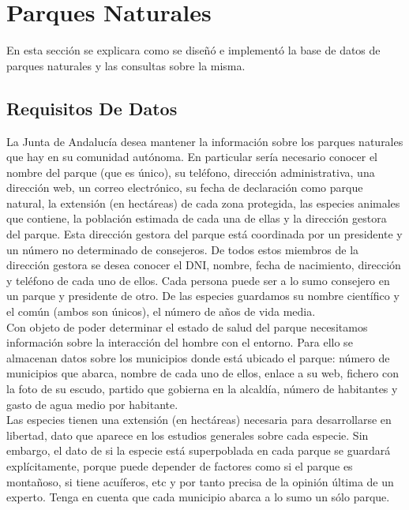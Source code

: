 \documentclass{article}
\begin{document}
\section{Parques Naturales}

En esta sección se explicara como se diseñó e implementó la base de datos de parques naturales y las consultas sobre la misma.

\subsection{Requisitos De Datos}

La Junta de Andalucía desea mantener la información sobre los parques naturales que hay en su comunidad autónoma. En particular sería necesario conocer el nombre del parque (que es único), su teléfono, dirección administrativa, una dirección web, un correo electrónico, su fecha de declaración como parque natural, la extensión (en hectáreas) de cada zona protegida, las especies animales que contiene, la población estimada de cada una de ellas y la dirección gestora del parque. Esta dirección gestora del parque está coordinada por un presidente y un número no determinado de consejeros. De todos estos miembros de la dirección gestora se desea conocer el DNI, nombre, fecha de nacimiento, dirección y teléfono de cada uno de ellos. Cada persona puede ser a lo sumo consejero en un parque y presidente de otro. De las especies guardamos su nombre científico y el común (ambos son únicos), el número de años de vida media. 
\\

Con objeto de poder determinar el estado de salud del parque necesitamos información sobre la interacción del hombre con el entorno. Para ello se almacenan datos sobre los municipios donde está ubicado el parque: número de municipios que abarca, nombre de cada uno de ellos, enlace a su web, fichero con la foto de su escudo, partido que gobierna en la alcaldía, número de habitantes y gasto de agua medio por habitante. 
\\

Las especies tienen una extensión (en hectáreas) necesaria para desarrollarse en libertad, dato que aparece en los estudios generales sobre cada especie. Sin embargo, el dato de si la especie está superpoblada en cada parque se guardará explícitamente, porque puede depender de factores como si el parque es montañoso, si tiene acuíferos, etc y por tanto precisa de la opinión última de un experto. Tenga en cuenta que cada municipio abarca a lo sumo un sólo parque. 
\end{document}

